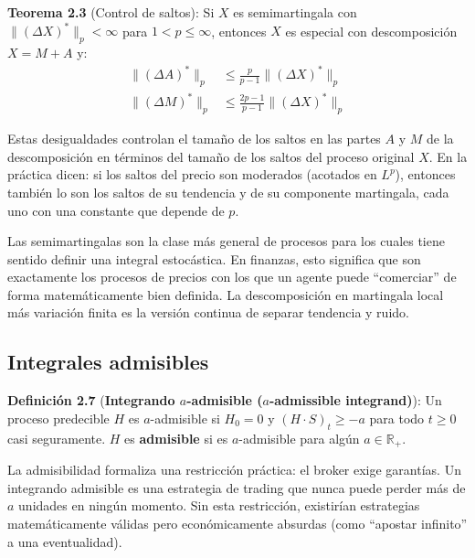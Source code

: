\documentclass[12pt]{article}
\begin{document}
\textbf{Teorema 2.3} (Control de saltos): Si $X$ es semimartingala con $\|(\Delta X)^*\|_p < \infty$ para $1 < p \leq \infty$, entonces $X$ es especial con descomposici\'on $X = M + A$ y:
\begin{align}
    \|(\Delta A)^*\|_p &\leq \frac{p}{p-1} \|(\Delta X)^*\|_p \\
    \|(\Delta M)^*\|_p &\leq \frac{2p-1}{p-1} \|(\Delta X)^*\|_p
\end{align}

\begin{intuicionmat}
Estas desigualdades controlan el tama\~no de los saltos en las partes $A$ y $M$ de la descomposici\'on en t\'erminos del tama\~no de los saltos del proceso original $X$. En la pr\'actica dicen: si los saltos del precio son moderados (acotados en $L^p$), entonces tambi\'en lo son los saltos de su tendencia y de su componente martingala, cada uno con una constante que depende de $p$.
\end{intuicionmat}

\begin{intuicion}
Las semimartingalas son la clase m\'as general de procesos para los cuales tiene sentido definir una integral estoc\'astica. En finanzas, esto significa que son exactamente los procesos de precios con los que un agente puede ``comerciar'' de forma matem\'aticamente bien definida. La descomposici\'on en martingala local m\'as variaci\'on finita es la versi\'on continua de separar tendencia y ruido.
\end{intuicion}

\subsection{Integrales admisibles}

\textbf{Definici\'on 2.7} (\textbf{Integrando $a$-admisible ($a$-admissible integrand)}): Un proceso predecible $H$ es $a$-admisible si $H_0 = 0$ y $(H \cdot S)_t \geq -a$ para todo $t \geq 0$ casi seguramente. $H$ es \textbf{admisible} si es $a$-admisible para alg\'un $a \in \mathbb{R}_+$.

\begin{intuicion}
La admisibilidad formaliza una restricci\'on pr\'actica: el broker exige garant\'ias. Un integrando admisible es una estrategia de trading que nunca puede perder m\'as de $a$ unidades en ning\'un momento. Sin esta restricci\'on, existir\'ian estrategias matem\'aticamente v\'alidas pero econ\'omicamente absurdas (como ``apostar infinito'' a una eventualidad).
\end{intuicion}
\end{document}

